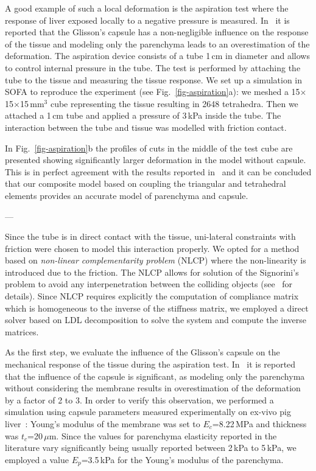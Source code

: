 \documentclass[final,3p,times,twocolumn]{elsarticle}
\begin{document}
A good example of such a local deformation is the aspiration test
where the response of liver exposed locally to a negative pressure is measured.
In~\cite{Hollenstein2006} it is reported that the Glisson's
capsule has a non-negligible influence on the response of the tissue and modeling
only the parenchyma leads to an overestimation of the deformation. 
The aspiration device consists of a tube 1\,cm in diameter and allows
to control internal pressure in the tube. The test is performed by
attaching the tube to the tissue and measuring the tissue response. We
set up a simulation in SOFA to reproduce the experiment (see Fig.~\ref{fig-aspiration}a): we meshed a 15$\times$15$\times$15\,mm$^3$ 
cube representing the tissue 
resulting in 2648 tetrahedra. Then we attached a 1\,cm tube 
and applied a pressure of 3\,kPa inside the tube. The interaction between the tube and 
tissue was modelled with friction contact. 

In Fig.~\ref{fig-aspiration}b the profiles of cuts in the middle of the
test cube are presented showing significantly larger deformation in the model without capsule. This is in perfect 
agreement with the results reported in~\cite{Hollenstein2006} and it can be concluded that 
our composite model based on coupling the triangular and tetrahedral elements provides an accurate 
model of parenchyma and capsule.

---

Since the tube is in direct contact with the tissue, uni-lateral constraints with friction were chosen 
to model this interaction properly. We opted for a method based on \emph{non-linear complementarity problem}  (NLCP)
where the non-linearity is introduced due to the friction. The NLCP
allows for solution of the Signorini's problem to avoid any interpenetration between the colliding 
objects (see~\cite{Duriez2006b} for details). Since NLCP requires explicitly the computation of compliance matrix which 
is homogeneous to the inverse of the stiffness matrix, we employed a direct solver based on LDL decomposition to 
solve the system and compute the inverse matrices. 


As the first step, we evaluate the influence of the Glisson's capsule on the mechanical response of the tissue during
the aspiration test. 
In~\cite{Hollenstein2006} it is reported that the influence of the capsule is significant, as modeling 
only the parenchyma without considering the membrane results in overestimation of the deformation by a factor of 2 to 3. 
In order to verify this observation, we performed a simulation using capsule parameters measured experimentally on 
ex-vivo pig liver~\cite{Umale2011}: Young's modulus of the membrane was set to $E_c$=8.22\,MPa and thickness was
$t_c$=20\,$\mu$m. 
Since the values for parenchyma elasticity reported in the literature vary significantly being usually reported between 2\,kPa to 5\,kPa, 
we employed a value $E_p$=3.5\,kPa for the Young's modulus of the parenchyma. 
\end{document}
